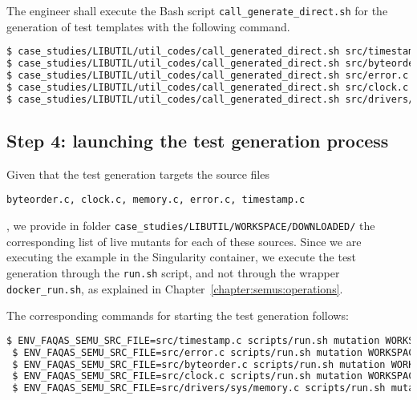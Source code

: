 The engineer shall execute the Bash script \texttt{call\_generate\_direct.sh} for the generation of test templates with the following command.

\begin{lstlisting}[language=bash]
$ case_studies/LIBUTIL/util_codes/call_generated_direct.sh src/timestamp.c
$ case_studies/LIBUTIL/util_codes/call_generated_direct.sh src/byteorder.c
$ case_studies/LIBUTIL/util_codes/call_generated_direct.sh src/error.c
$ case_studies/LIBUTIL/util_codes/call_generated_direct.sh src/clock.c
$ case_studies/LIBUTIL/util_codes/call_generated_direct.sh src/drivers/sys/memory.c
\end{lstlisting}

\subsection{Step 4: launching the test generation process}

Given that the test generation targets the source files \begin{small}\texttt{byteorder.c, clock.c, memory.c, error.c, timestamp.c}\end{small}, we provide in folder \texttt{case\_studies/LIBUTIL/WORKSPACE/DOWNLOADED/} the corresponding list of live mutants for each of these sources. 
Since we are executing the example in the Singularity container, we execute the test generation through the \texttt{run.sh} script, and not through the wrapper \texttt{docker\_run.sh}, as explained in Chapter~\ref{chapter:semus:operations}.

The corresponding commands for starting the test generation follows:

\begin{lstlisting}[language=bash]
 $ ENV_FAQAS_SEMU_SRC_FILE=src/timestamp.c scripts/run.sh mutation WORKSPACE/DOWNLOADED/live-src.timestamp WORKSPACE/OUTPUT/live_mutants_output
 $ ENV_FAQAS_SEMU_SRC_FILE=src/error.c scripts/run.sh mutation WORKSPACE/DOWNLOADED/live-src.error WORKSPACE/OUTPUT/live_mutants_output
 $ ENV_FAQAS_SEMU_SRC_FILE=src/byteorder.c scripts/run.sh mutation WORKSPACE/DOWNLOADED/live-src.byteorder WORKSPACE/OUTPUT/live_mutants_output
 $ ENV_FAQAS_SEMU_SRC_FILE=src/clock.c scripts/run.sh mutation WORKSPACE/DOWNLOADED/live-src.clock WORKSPACE/OUTPUT/live_mutants_output
 $ ENV_FAQAS_SEMU_SRC_FILE=src/drivers/sys/memory.c scripts/run.sh mutation WORKSPACE/DOWNLOADED/live-src.drivers.sys.memory WORKSPACE/OUTPUT/live_mutants_output
\end{lstlisting}

